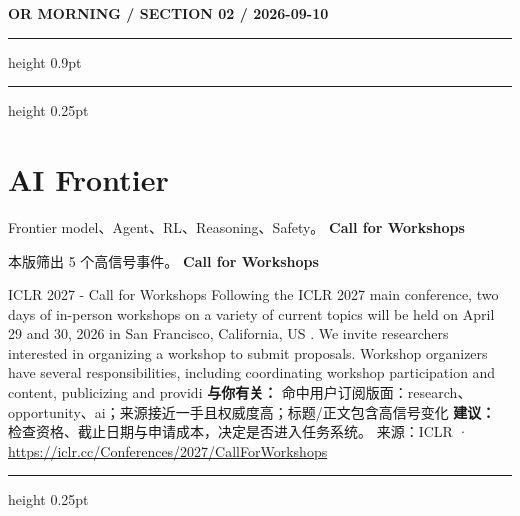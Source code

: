 \documentclass[10.5pt]{ctexart}
\begin{document}
\newpage
{\small\bfseries OR MORNING / SECTION 02 / 2026-09-10}
\vspace{2mm}
\hrule height 0.9pt
\vspace{1.5mm}
\hrule height 0.25pt
\vspace{4mm}
\section*{AI Frontier}
{\color{ormuted} Frontier model、Agent、RL、Reasoning、Safety。}
\vspace{2mm}
{\LARGE\bfseries Call for Workshops}\par
\vspace{1mm}
{\color{ormuted} 本版筛出 5 个高信号事件。}
\vspace{3mm}
{\Large\bfseries Call for Workshops}\par
ICLR 2027 - Call for Workshops Following the ICLR 2027 main conference, two days of in-person workshops on a variety of current topics will be held on April 29 and 30, 2026 in San Francisco, California, US . We invite researchers interested in organizing a workshop to submit proposals. Workshop organizers have several responsibilities, including coordinating workshop participation and content, publicizing and providi
\textbf{与你有关：} 命中用户订阅版面：research、opportunity、ai；来源接近一手且权威度高；标题/正文包含高信号变化
\textbf{建议：} 检查资格、截止日期与申请成本，决定是否进入任务系统。
{\footnotesize\color{ormuted} 来源：ICLR · \url{https://iclr.cc/Conferences/2027/CallForWorkshops}}
\vspace{4mm}
\hrule height 0.25pt
\vspace{3mm}
\end{document}
